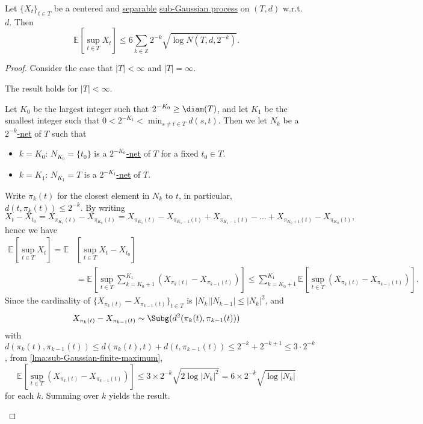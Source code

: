 \begin{theorem}\label{thm:Dudley-entropy-bound}
	Let \(\{ X_t \} _{t\in T}\) be a centered and \hyperref[def:separable]{separable} \hyperref[def:sub-Gaussian-process]{sub-Gaussian process} on \((T, d)\) w.r.t.\ \(d\). Then
	\[
		\mathbb{E}_{}\left[\sup _{t\in T} X_t \right] \leq 6 \sum_{k\in \mathbb{Z} } 2^{-k} \sqrt{\log N(T, d, 2^{-k})} .
	\]
\end{theorem}
\begin{proof}
	Consider the case that \(\vert T \vert < \infty \) and \(\vert T \vert = \infty \).

	\begin{claim}
		The result holds for \(\vert T \vert < \infty \).
	\end{claim}
	\begin{explanation}
		Let \(K_0\) be the largest integer such that \(2^{-K_0} \geq \diam(T) \), and let \(K_1\) be the smallest integer such that \(0 < 2^{-K_1} < \min _{s \neq t\in T} d(s, t)\). Then we let \(N_k\) be a \hyperref[def:eps-net]{\(2^{-k}\)-net} of \(T\) such that
		\begin{itemize}
			\item \(k = K_0\): \(N_{K_0} = \{ t_0 \} \) is a \hyperref[def:eps-net]{\(2^{-K_0}\)-net} of \(T\) for a fixed \(t_0\in T\).
			\item \(k = K_1\): \(N_{K_1} = T\) is a \hyperref[def:eps-net]{\(2^{-K_1}\)-net} of \(T\).
		\end{itemize}
		Write \(\pi _k(t)\) for the closest element in \(N_k\) to \(t\), in particular, \(d(t, \pi _k(t)) \leq 2^{-k}\). By writing
		\[
			X_t - X_{t_0}
			= X_{\pi _{K_1} (t)} - X_{\pi _{K_0} (t)}
			= X_{\pi _{K_1}(t)} - X_{\pi _{K_1 - 1} (t)} + X_{\pi _{K_1 - 1} (t)} - \dots + X_{\pi _{K_0 + 1} (t)} - X_{\pi _{K_0} (t)},
		\]
		hence we have
		\[
			\begin{split}
				\mathbb{E}_{}\left[\sup _{t\in T} X_t \right]
				= \mathbb{E}_{} & \left[\sup _{t\in T} X_t - X_{t_0} \right]                                                                           \\
				                & = \mathbb{E}_{}\left[\sup _{t\in T} \sum_{k=K_0 + 1}^{K_1} \left( X_{\pi _k (t)} - X_{\pi _{k-1}(t)} \right) \right]
				\leq \sum_{k=K_0 + 1}^{K_1} \mathbb{E}_{}\left[\sup _{t\in T} \left( X_{\pi _k(t)} - X_{\pi _{k-1} (t)} \right) \right].
			\end{split}
		\]
		Since the cardinality of \(\{ X_{\pi _k(t)} - X_{\pi _{k-1} (t)} \}_{t\in T}\) is \(\vert N_k \vert \vert N_{k-1} \vert \leq \vert N_k \vert ^2\), and
		\[
			X_{\pi _k(t)} - X_{\pi _{k-1}(t)} \sim \Subg(d^2(\pi _k(t), \pi _{k-1}(t)))
		\]
		with \(d(\pi _k(t), \pi _{k-1}(t)) \leq d(\pi _k(t), t) + d(t, \pi _{k-1}(t)) \leq 2^{-k} + 2^{-k+1} \leq 3\cdot 2^{-k}\), from \autoref{lma:sub-Gaussian-finite-maximum},
		\[
			\mathbb{E}_{}\left[\sup _{t\in T} \left( X_{\pi _k(t)} - X_{\pi _{k-1}(t)} \right) \right]
			\leq 3 \times 2^{-k} \sqrt{2 \log \vert N_k \vert ^2}
			= 6 \times 2^{-k} \sqrt{\log \vert N_k \vert }
		\]
		for each \(k\). Summing over \(k\) yields the result.
	\end{explanation}


\end{proof}
